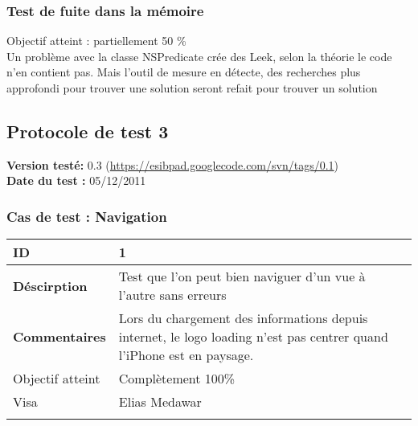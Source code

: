 		 		 \subsubsection*{Test de fuite dans la mémoire}
		 		 Objectif atteint : {\color{red}partiellement 50 \% \CheckedBox}\\
		 		 Un problème avec la classe NSPredicate crée des Leek, selon la théorie le code n'en contient pas. Mais l'outil de mesure en détecte, des recherches plus approfondi pour trouver une solution seront refait pour trouver un solution
		 
		\subsection{Protocole de test 3}
		 		\textbf{Version testé:} 0.3 (\url{https://esibpad.googlecode.com/svn/tags/0.1}) \\
		 		\textbf{	Date du test :} 05/12/2011
		 
		 		\subsubsection*{Cas de test : Navigation}
		 				 \begin{longtable}{m{4cm}|p{10cm}|}
		 				 \textbf{ ID} & 1 \\
		 				 \hline \textbf{Déscirption} & Test que l'on peut bien naviguer d'un vue à l'autre sans erreurs\\
		 				 \hline \textbf{Commentaires} &Lors du chargement des informations depuis internet, le logo loading n'est pas centrer quand l'iPhone		 est en paysage. \\
		 				 \hline Objectif  atteint & {\color{green} Complètement 100\% \CheckedBox } \\
		 				\hline Visa & Elias Medawar \\	
		 				 \\
		 			 \end{longtable} 
